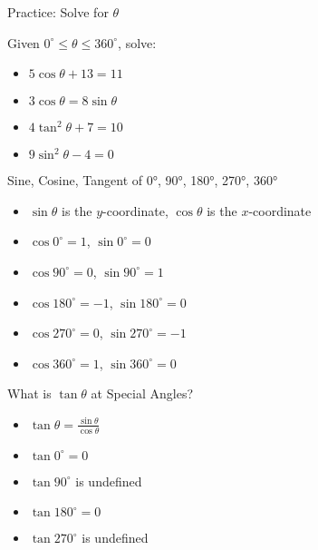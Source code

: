 \documentclass[aspectratio=169]{beamer}
\begin{document}
\begin{frame}{Practice: Solve for $\theta$}
    \begin{tcolorbox}[colback=lightgray,colframe=accent,title=Practice]
        \footnotesize
        Given $0^\circ \leq \theta \leq 360^\circ$, solve:
        \begin{itemize}
            \item $5\cos\theta + 13 = 11$
            \item $3\cos\theta = 8\sin\theta$
            \item $4\tan^2\theta + 7 = 10$
            \item $9\sin^2\theta - 4 = 0$
        \end{itemize}
    \end{tcolorbox}
\end{frame}

\begin{frame}{Sine, Cosine, Tangent of 0°, 90°, 180°, 270°, 360°}
    \begin{tcolorbox}[colback=lightgray,colframe=primary,title=Special Angles]
        \footnotesize
        \begin{itemize}
            \item $\sin\theta$ is the $y$-coordinate, $\cos\theta$ is the $x$-coordinate
            \item $\cos 0^\circ = 1$, $\sin 0^\circ = 0$
            \item $\cos 90^\circ = 0$, $\sin 90^\circ = 1$
            \item $\cos 180^\circ = -1$, $\sin 180^\circ = 0$
            \item $\cos 270^\circ = 0$, $\sin 270^\circ = -1$
            \item $\cos 360^\circ = 1$, $\sin 360^\circ = 0$
        \end{itemize}
    \end{tcolorbox}
\end{frame}

\begin{frame}{What is $\tan\theta$ at Special Angles?}
    \begin{tcolorbox}[colback=lightgray,colframe=accent,title=Special Tangent Values]
        \footnotesize
        \begin{itemize}
            \item $\tan\theta = \frac{\sin\theta}{\cos\theta}$
            \item $\tan 0^\circ = 0$
            \item $\tan 90^\circ$ is undefined
            \item $\tan 180^\circ = 0$
            \item $\tan 270^\circ$ is undefined
        \end{itemize}
    \end{tcolorbox}
\end{frame}
\end{document}
